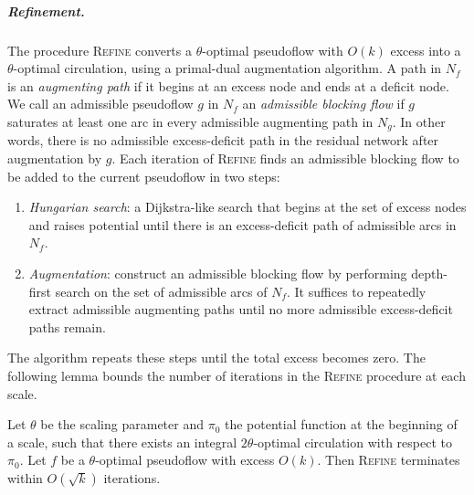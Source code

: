 \documentclass[a4paper,UKenglish,nolineno]{socg-lipics-v2019}
\def\EMPH#1{\textcolor{BrickRed}{{\emph{#1}}}}
\begin{document}
\subparagraph{Refinement.}
The procedure \textsc{Refine} converts a $\theta$-optimal pseudoflow with
$O(k)$ excess into a $\theta$-optimal circulation, using a primal-dual
augmentation algorithm.
A path in $N_f$ is an \EMPH{augmenting path} if it begins at an excess node
and ends at a deficit node.
We call an admissible pseudoflow $g$ in $N_f$ an
\EMPH{admissible blocking flow} if $g$ saturates at least one arc in every
admissible augmenting path in $N_g$.
In other words, there is no admissible excess-deficit path in the residual
network after augmentation by $g$.
Each iteration of \textsc{Refine} finds an admissible blocking flow to be added
to the current pseudoflow in two steps:
\begin{enumerate}
\item
\EMPH{Hungarian search}: a Dijkstra-like search that begins at the set of
excess nodes and raises potential until there is an excess-deficit path
of admissible arcs in $N_f$.
\item
\EMPH{Augmentation}: construct an admissible blocking flow by performing
depth-first search on the set of admissible arcs of $N_f$.
It suffices to repeatedly extract admissible augmenting paths until no more
admissible excess-deficit paths remain.
\end{enumerate}
The algorithm repeats these steps until the total excess becomes zero.
The following lemma bounds the number of iterations in the \textsc{Refine}
procedure at each scale.

\begin{lemma}
\label{lemma:refine_iters}
Let $\theta$ be the scaling parameter and $\pi_0$ the potential function at the
beginning of a scale, such that there exists an integral $2\theta$-optimal
circulation with respect to $\pi_0$.
Let $f$ be a $\theta$-optimal pseudoflow with excess $O(k)$.
Then \textsc{Refine} terminates within $O(\sqrt{k})$ iterations.
\end{lemma}
\end{document}
